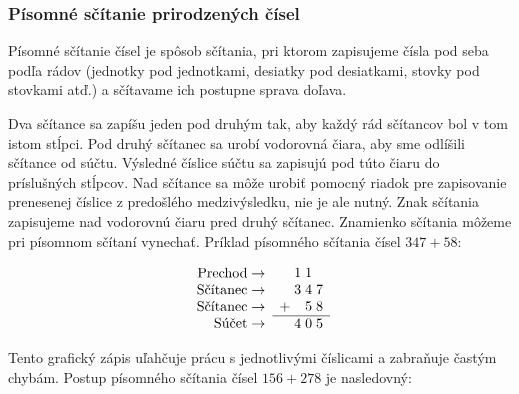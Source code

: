 \documentclass{report}
\begin{document}
\subsubsection{Písomné sčítanie prirodzených čísel} 

Písomné sčítanie čísel je spôsob sčítania, pri ktorom zapisujeme čísla pod seba podľa rádov (jednotky pod jednotkami, desiatky pod desiatkami, stovky pod stovkami atď.) a sčítavame ich postupne sprava doľava.

Dva sčítance sa zapíšu jeden pod druhým tak, aby každý rád sčítancov bol v tom istom stĺpci. Pod druhý sčítanec sa urobí vodorovná čiara, aby sme odlíšili sčítance od súčtu. Výsledné číslice súčtu sa zapisujú pod túto čiaru do príslušných stĺpcov. Nad sčítance sa môže urobiť pomocný riadok pre zapisovanie prenesenej číslice z predošlého medzivýsledku, nie je ale nutný. Znak sčítania zapisujeme nad vodorovnú čiaru pred druhý sčítanec. Znamienko sčítania môžeme pri písomnom sčítaní vynechať. Príklad písomného sčítania čísel \(347 + 58\):
\begin{table}[H]
  \centering
  \[
  \begin{array}{r}
    \text{Prechod} \rightarrow \\
    \text{Sčítanec} \rightarrow \\
    \text{Sčítanec} \rightarrow \\
    \text{Súčet} \rightarrow \\
  \end{array}
  \begin{array}{c@{\;}c@{\;}c@{\;}c}
      & 1 & 1 &  \\
      & 3 & 4 & 7 \\
    + &   & 5 & 8 \\
    \hline
      & 4 & 0 & 5
  \end{array}
  \]
\end{table}

Tento grafický zápis uľahčuje prácu s jednotlivými číslicami a zabraňuje častým chybám. Postup písomného sčítania čísel \(156 + 278\) je nasledovný:
\end{document}
